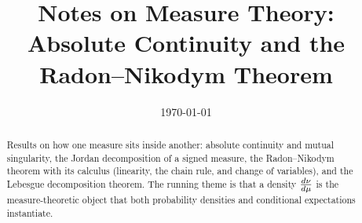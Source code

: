 \documentclass[11pt]{article}
\title{Notes on Measure Theory:\\ Absolute Continuity and the Radon--Nikodym Theorem}
\date{\today}
\begin{document}
\maketitle

\begin{abstract}
Results on how one measure sits inside another: absolute continuity and mutual
singularity, the Jordan decomposition of a signed measure, the Radon--Nikodym
theorem with its calculus (linearity, the chain rule, and change of variables),
and the Lebesgue decomposition theorem. The running theme is that a density
$\frac{d \nu}{d \mu}$ is the measure-theoretic object that both probability densities
and conditional expectations instantiate.
\end{abstract}

\tableofcontents
\bigskip




\end{document}
